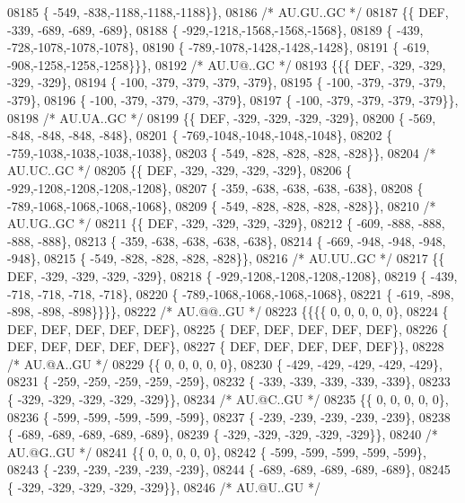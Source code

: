 \begin{DoxyCode}
08185 \{ -549, -838,-1188,-1188,-1188\}\},
08186 \textcolor{comment}{/* AU.GU..GC */}
08187 \{\{  DEF, -339, -689, -689, -689\},
08188 \{ -929,-1218,-1568,-1568,-1568\},
08189 \{ -439, -728,-1078,-1078,-1078\},
08190 \{ -789,-1078,-1428,-1428,-1428\},
08191 \{ -619, -908,-1258,-1258,-1258\}\}\},
08192 \textcolor{comment}{/* AU.U@..GC */}
08193 \{\{\{  DEF, -329, -329, -329, -329\},
08194 \{ -100, -379, -379, -379, -379\},
08195 \{ -100, -379, -379, -379, -379\},
08196 \{ -100, -379, -379, -379, -379\},
08197 \{ -100, -379, -379, -379, -379\}\},
08198 \textcolor{comment}{/* AU.UA..GC */}
08199 \{\{  DEF, -329, -329, -329, -329\},
08200 \{ -569, -848, -848, -848, -848\},
08201 \{ -769,-1048,-1048,-1048,-1048\},
08202 \{ -759,-1038,-1038,-1038,-1038\},
08203 \{ -549, -828, -828, -828, -828\}\},
08204 \textcolor{comment}{/* AU.UC..GC */}
08205 \{\{  DEF, -329, -329, -329, -329\},
08206 \{ -929,-1208,-1208,-1208,-1208\},
08207 \{ -359, -638, -638, -638, -638\},
08208 \{ -789,-1068,-1068,-1068,-1068\},
08209 \{ -549, -828, -828, -828, -828\}\},
08210 \textcolor{comment}{/* AU.UG..GC */}
08211 \{\{  DEF, -329, -329, -329, -329\},
08212 \{ -609, -888, -888, -888, -888\},
08213 \{ -359, -638, -638, -638, -638\},
08214 \{ -669, -948, -948, -948, -948\},
08215 \{ -549, -828, -828, -828, -828\}\},
08216 \textcolor{comment}{/* AU.UU..GC */}
08217 \{\{  DEF, -329, -329, -329, -329\},
08218 \{ -929,-1208,-1208,-1208,-1208\},
08219 \{ -439, -718, -718, -718, -718\},
08220 \{ -789,-1068,-1068,-1068,-1068\},
08221 \{ -619, -898, -898, -898, -898\}\}\}\},
08222 \textcolor{comment}{/* AU.@@..GU */}
08223 \{\{\{\{    0,    0,    0,    0,    0\},
08224 \{  DEF,  DEF,  DEF,  DEF,  DEF\},
08225 \{  DEF,  DEF,  DEF,  DEF,  DEF\},
08226 \{  DEF,  DEF,  DEF,  DEF,  DEF\},
08227 \{  DEF,  DEF,  DEF,  DEF,  DEF\}\},
08228 \textcolor{comment}{/* AU.@A..GU */}
08229 \{\{    0,    0,    0,    0,    0\},
08230 \{ -429, -429, -429, -429, -429\},
08231 \{ -259, -259, -259, -259, -259\},
08232 \{ -339, -339, -339, -339, -339\},
08233 \{ -329, -329, -329, -329, -329\}\},
08234 \textcolor{comment}{/* AU.@C..GU */}
08235 \{\{    0,    0,    0,    0,    0\},
08236 \{ -599, -599, -599, -599, -599\},
08237 \{ -239, -239, -239, -239, -239\},
08238 \{ -689, -689, -689, -689, -689\},
08239 \{ -329, -329, -329, -329, -329\}\},
08240 \textcolor{comment}{/* AU.@G..GU */}
08241 \{\{    0,    0,    0,    0,    0\},
08242 \{ -599, -599, -599, -599, -599\},
08243 \{ -239, -239, -239, -239, -239\},
08244 \{ -689, -689, -689, -689, -689\},
08245 \{ -329, -329, -329, -329, -329\}\},
08246 \textcolor{comment}{/* AU.@U..GU */}

\end{DoxyCode}
